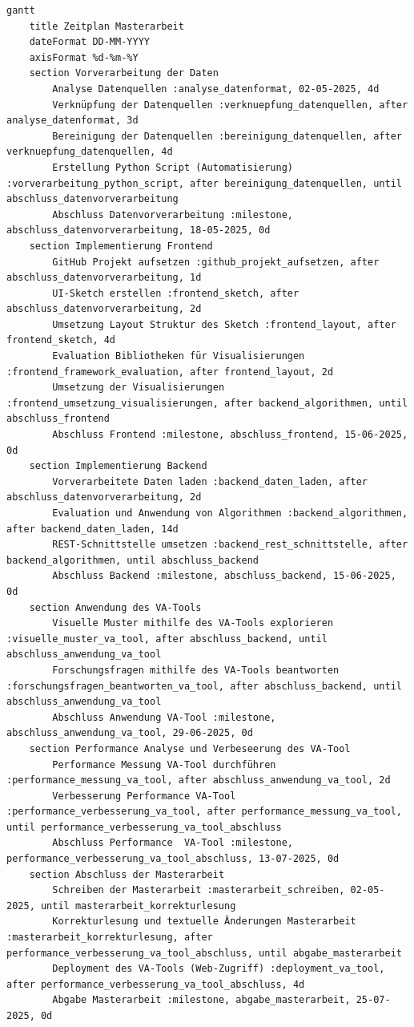 \begin{lstlisting}
gantt
    title Zeitplan Masterarbeit
    dateFormat DD-MM-YYYY
    axisFormat %d-%m-%Y
    section Vorverarbeitung der Daten
        Analyse Datenquellen :analyse_datenformat, 02-05-2025, 4d
        Verknüpfung der Datenquellen :verknuepfung_datenquellen, after analyse_datenformat, 3d
        Bereinigung der Datenquellen :bereinigung_datenquellen, after verknuepfung_datenquellen, 4d
        Erstellung Python Script (Automatisierung) :vorverarbeitung_python_script, after bereinigung_datenquellen, until abschluss_datenvorverarbeitung
        Abschluss Datenvorverarbeitung :milestone, abschluss_datenvorverarbeitung, 18-05-2025, 0d 
    section Implementierung Frontend
        GitHub Projekt aufsetzen :github_projekt_aufsetzen, after abschluss_datenvorverarbeitung, 1d
        UI-Sketch erstellen :frontend_sketch, after abschluss_datenvorverarbeitung, 2d
        Umsetzung Layout Struktur des Sketch :frontend_layout, after frontend_sketch, 4d
        Evaluation Bibliotheken für Visualisierungen :frontend_framework_evaluation, after frontend_layout, 2d
        Umsetzung der Visualisierungen :frontend_umsetzung_visualisierungen, after backend_algorithmen, until abschluss_frontend
        Abschluss Frontend :milestone, abschluss_frontend, 15-06-2025, 0d
    section Implementierung Backend
        Vorverarbeitete Daten laden :backend_daten_laden, after abschluss_datenvorverarbeitung, 2d
        Evaluation und Anwendung von Algorithmen :backend_algorithmen, after backend_daten_laden, 14d
        REST-Schnittstelle umsetzen :backend_rest_schnittstelle, after backend_algorithmen, until abschluss_backend
        Abschluss Backend :milestone, abschluss_backend, 15-06-2025, 0d
    section Anwendung des VA-Tools
        Visuelle Muster mithilfe des VA-Tools explorieren :visuelle_muster_va_tool, after abschluss_backend, until abschluss_anwendung_va_tool
        Forschungsfragen mithilfe des VA-Tools beantworten :forschungsfragen_beantworten_va_tool, after abschluss_backend, until abschluss_anwendung_va_tool
        Abschluss Anwendung VA-Tool :milestone, abschluss_anwendung_va_tool, 29-06-2025, 0d
    section Performance Analyse und Verbeseerung des VA-Tool
        Performance Messung VA-Tool durchführen :performance_messung_va_tool, after abschluss_anwendung_va_tool, 2d
        Verbesserung Performance VA-Tool :performance_verbesserung_va_tool, after performance_messung_va_tool, until performance_verbesserung_va_tool_abschluss
        Abschluss Performance  VA-Tool :milestone, performance_verbesserung_va_tool_abschluss, 13-07-2025, 0d
    section Abschluss der Masterarbeit
        Schreiben der Masterarbeit :masterarbeit_schreiben, 02-05-2025, until masterarbeit_korrekturlesung
        Korrekturlesung und textuelle Änderungen Masterarbeit :masterarbeit_korrekturlesung, after performance_verbesserung_va_tool_abschluss, until abgabe_masterarbeit
        Deployment des VA-Tools (Web-Zugriff) :deployment_va_tool, after performance_verbesserung_va_tool_abschluss, 4d
        Abgabe Masterarbeit :milestone, abgabe_masterarbeit, 25-07-2025, 0d
\end{lstlisting}